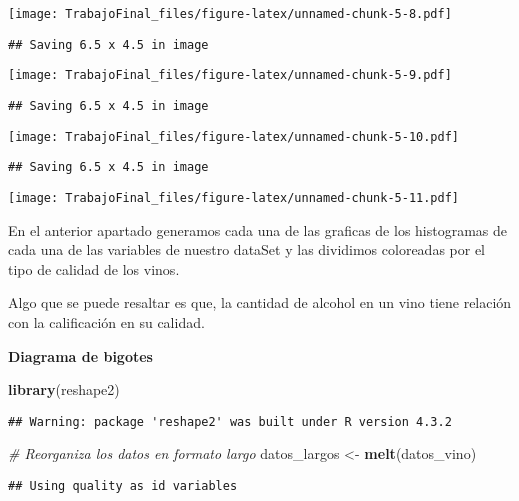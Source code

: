 \documentclass[
]{article}
\newenvironment{Shaded}{\begin{snugshade}}{\end{snugshade}}
\newcommand{\CommentTok}[1]{\textcolor[rgb]{0.56,0.35,0.01}{\textit{#1}}}
\newcommand{\FunctionTok}[1]{\textcolor[rgb]{0.13,0.29,0.53}{\textbf{#1}}}
\newcommand{\NormalTok}[1]{#1}
\newcommand{\OtherTok}[1]{\textcolor[rgb]{0.56,0.35,0.01}{#1}}
\begin{document}
\texttt{[image: TrabajoFinal\_files/figure-latex/unnamed-chunk-5-8.pdf]}

\begin{verbatim}
## Saving 6.5 x 4.5 in image
\end{verbatim}

\texttt{[image: TrabajoFinal\_files/figure-latex/unnamed-chunk-5-9.pdf]}

\begin{verbatim}
## Saving 6.5 x 4.5 in image
\end{verbatim}

\texttt{[image: TrabajoFinal\_files/figure-latex/unnamed-chunk-5-10.pdf]}

\begin{verbatim}
## Saving 6.5 x 4.5 in image
\end{verbatim}

\texttt{[image: TrabajoFinal\_files/figure-latex/unnamed-chunk-5-11.pdf]}

En el anterior apartado generamos cada una de las graficas de los
histogramas de cada una de las variables de nuestro dataSet y las
dividimos coloreadas por el tipo de calidad de los vinos.

Algo que se puede resaltar es que, la cantidad de alcohol en un vino
tiene relación con la calificación en su calidad.

\textbf{Diagrama de bigotes}

\begin{Shaded}
\begin{Highlighting}[]
\FunctionTok{library}\NormalTok{(reshape2)}
\end{Highlighting}
\end{Shaded}

\begin{verbatim}
## Warning: package 'reshape2' was built under R version 4.3.2
\end{verbatim}

\begin{Shaded}
\begin{Highlighting}[]
\CommentTok{\# Reorganiza los datos en formato largo}
\NormalTok{datos\_largos }\OtherTok{\textless{}{-}} \FunctionTok{melt}\NormalTok{(datos\_vino)}
\end{Highlighting}
\end{Shaded}

\begin{verbatim}
## Using quality as id variables
\end{verbatim}
\end{document}
